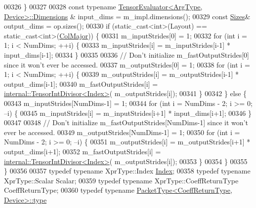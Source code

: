 \begin{DoxyCode}
00326     \}
00327 
00328     \textcolor{keyword}{const} \textcolor{keyword}{typename} \hyperlink{struct_eigen_1_1_tensor_evaluator}{TensorEvaluator<ArgType, Device>::Dimensions}
      & input\_dims = m\_impl.dimensions();
00329     \textcolor{keyword}{const} \hyperlink{struct_eigen_1_1_sizes}{Sizes}& output\_dims = op.sizes();
00330     \textcolor{keywordflow}{if} (static\_cast<int>(Layout) == static\_cast<int>(\hyperlink{group__enums_ggaacded1a18ae58b0f554751f6cdf9eb13a0cbd4bdd0abcfc0224c5fcb5e4f6669a}{ColMajor})) \{
00331       m\_inputStrides[0] = 1;
00332       \textcolor{keywordflow}{for} (\textcolor{keywordtype}{int} i = 1; i < NumDims; ++i) \{
00333         m\_inputStrides[i] = m\_inputStrides[i-1] * input\_dims[i-1];
00334       \}
00335 
00336      \textcolor{comment}{// Don't initialize m\_fastOutputStrides[0] since it won't ever be accessed.}
00337       m\_outputStrides[0] = 1;
00338       \textcolor{keywordflow}{for} (\textcolor{keywordtype}{int} i = 1; i < NumDims; ++i) \{
00339         m\_outputStrides[i] = m\_outputStrides[i-1] * output\_dims[i-1];
00340         m\_fastOutputStrides[i] = \hyperlink{struct_eigen_1_1internal_1_1_tensor_int_divisor}{internal::TensorIntDivisor<Index>}(
      m\_outputStrides[i]);
00341       \}
00342     \} \textcolor{keywordflow}{else} \{
00343       m\_inputStrides[NumDims-1] = 1;
00344       \textcolor{keywordflow}{for} (\textcolor{keywordtype}{int} i = NumDims - 2; i >= 0; --i) \{
00345         m\_inputStrides[i] = m\_inputStrides[i+1] * input\_dims[i+1];
00346       \}
00347 
00348      \textcolor{comment}{// Don't initialize m\_fastOutputStrides[NumDims-1] since it won't ever be accessed.}
00349       m\_outputStrides[NumDims-1] = 1;
00350       \textcolor{keywordflow}{for} (\textcolor{keywordtype}{int} i = NumDims - 2; i >= 0; --i) \{
00351         m\_outputStrides[i] = m\_outputStrides[i+1] * output\_dims[i+1];
00352         m\_fastOutputStrides[i] = \hyperlink{struct_eigen_1_1internal_1_1_tensor_int_divisor}{internal::TensorIntDivisor<Index>}(
      m\_outputStrides[i]);
00353       \}
00354     \}
00355   \}
00356 
00357   \textcolor{keyword}{typedef} \textcolor{keyword}{typename} XprType::Index \hyperlink{namespace_eigen_a62e77e0933482dafde8fe197d9a2cfde}{Index};
00358   \textcolor{keyword}{typedef} \textcolor{keyword}{typename} XprType::Scalar Scalar;
00359   \textcolor{keyword}{typedef} \textcolor{keyword}{typename} XprType::CoeffReturnType CoeffReturnType;
00360   \textcolor{keyword}{typedef} \textcolor{keyword}{typename} \hyperlink{group___sparse_core___module}{PacketType<CoeffReturnType, Device>::type} 

\end{DoxyCode}
